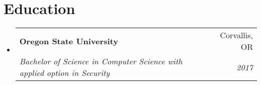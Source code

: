 \documentclass[letterpaper,12pt]{article}
\makeatletter
\newcommand{\resumeSubheading}[4]{
	\vspace{-1pt}\item
	\begin{tabular*}{0.97\textwidth}{l@{\extracolsep{\fill}}r}
		\textbf{#1} & #2 \\
		\textit{\small#3} & \textit{\small #4} \\
	\end{tabular*}\vspace{-5pt}
}
\newcommand{\resumeSubHeadingListStart}{\begin{itemize}[leftmargin=*]}
\newcommand{\resumeSubHeadingListEnd}{\end{itemize}}
\makeatother
\begin{document}


\section{Education}
\resumeSubHeadingListStart
\resumeSubheading
{Oregon State University}{Corvallis, OR}
{Bachelor of Science in Computer Science with applied option in Security}{2017}
\resumeSubHeadingListEnd

	
\end{document}
